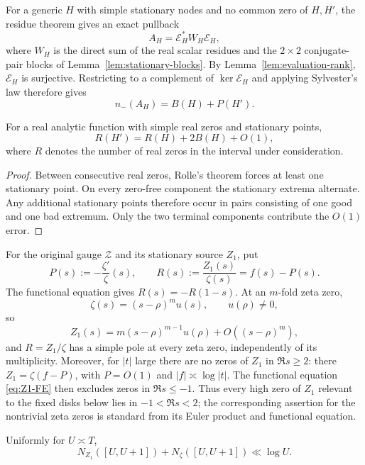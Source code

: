 For a generic $H$ with simple stationary nodes and no common zero of $H,H'$,
the residue theorem gives an exact pullback
\[
A_H=\mathcal E_H^*W_H\mathcal E_H,
\]
where $W_H$ is the direct sum of the real scalar residues and the $2\times2$
conjugate-pair blocks of Lemma~\ref{lem:stationary-blocks}. By
Lemma~\ref{lem:evaluation-rank}, $\mathcal E_H$ is surjective. Restricting to a
complement of $\ker\mathcal E_H$ and applying Sylvester's law therefore gives
\begin{equation}
\boxed{n_-(A_H)=B(H)+P(H').}
\label{eq:zero-inertia-generic}
\end{equation}

\begin{lemma}
\label{lem:real-bookkeeping}
For a real analytic function with simple real zeros and stationary points,
\[
R(H')=R(H)+2B(H)+O(1),
\label{eq:rolle-count}
\]
where $R$ denotes the number of real zeros in the interval under
consideration.
\end{lemma}

\begin{proof}
Between consecutive real zeros, Rolle's theorem forces at least one stationary
point. On every zero-free component the stationary extrema alternate. Any
additional stationary points therefore occur in pairs consisting of one good
and one bad extremum. Only the two terminal components contribute the
$O(1)$ error.
\end{proof}

For the original gauge $\mathscr Z$ and its stationary source $Z_1$, put
\[
P(s):=-\frac{\zeta'}\zeta(s),
\qquad
R(s):=\frac{Z_1(s)}{\zeta(s)}=f(s)-P(s).
\]
The functional equation gives $R(s)=-R(1-s)$. At an $m$-fold zeta zero,
\[
\zeta(s)=(s-\rho)^mu(s),\qquad u(\rho)\ne0,
\]
so
\[
Z_1(s)=m(s-\rho)^{m-1}u(\rho)+O((s-\rho)^m),
\]
and $R=Z_1/\zeta$ has a simple pole at every zeta zero, independently of its
multiplicity. Moreover, for $|t|$ large there are no zeros of $Z_1$ in
$\Re s\ge2$: there $Z_1=\zeta(f-P)$, with $P=O(1)$ and
$|f|\asymp\log|t|$. The functional equation \eqref{eq:Z1-FE} then excludes
zeros in $\Re s\le-1$. Thus every high zero of $Z_1$ relevant to the fixed
disks below lies in $-1<\Re s<2$; the corresponding assertion for the
nontrivial zeta zeros is standard from its Euler product and functional
equation.

\begin{lemma}
\label{lem:local-z1-count}
Uniformly for $U\asymp T$,
\begin{equation}
\boxed{
N_{Z_1}([U,U+1])+N_\zeta([U,U+1])\ll\log U.
}
\label{eq:local-z1-count}
\end{equation}
\end{lemma}


